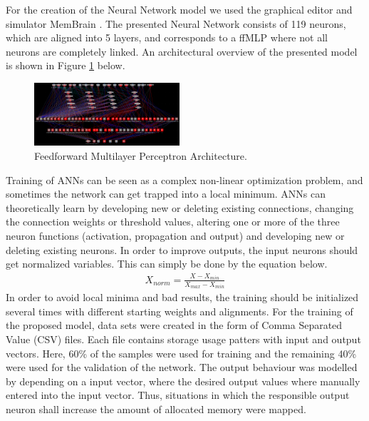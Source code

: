 For the creation of the Neural Network model we used the graphical editor and simulator MemBrain  \cite{MemBrain}. The presented Neural Network consists of 119 neurons, which are aligned into 5 layers, and corresponds to a ffMLP where not all neurons are completely linked. An architectural overview of the presented model is shown in Figure \ref{fig:Netz2} below.


\begin{figure}[ht]
	\begin{center}
		\includegraphics[width=0.48\textwidth]{fig/netz2.png}
	\end{center}
	\caption{Feedforward Multilayer Perceptron Architecture.}
	\label{fig:Netz2}
\end{figure}

Training of ANNs can be seen as a complex non-linear optimization problem, and sometimes the network can  get trapped into a local minimum. ANNs can theoretically learn by developing new or deleting existing connections, changing the connection weights or threshold values, altering one or more of the three neuron functions (activation, propagation and output) and developing new or deleting existing neurons. In order to improve outputs, the input neurons should get normalized variables. This can simply be done by the equation below.
\begin{eqnarray}
X_{norm}  = \frac{X - X_{min}}{X_{max} - X_{min} }
\end{eqnarray}
In order to avoid local minima and bad results, the training should be initialized several times with different  starting weights and alignments. For the training of the proposed model, data sets were created in the form of Comma Separated Value (CSV) files. Each file contains storage usage patters with input and output vectors. Here, 60\% of the samples were used for training and the remaining 40\% were used for the validation of the network. The output behaviour was modelled by depending on a input vector, where the desired output values where manually entered into the input vector. Thus, situations in which the responsible output neuron shall increase the amount of allocated memory were mapped.

